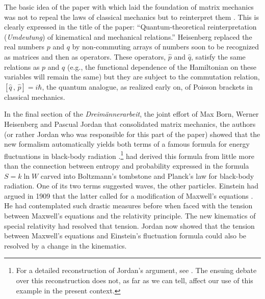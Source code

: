 The basic idea of the paper with which \citet{Heisenberg 1925} laid the foundation of matrix mechanics was not to repeal the laws of classical mechanics but to reinterpret them \citep[p.\ 139]{Janssen 2019}. This is clearly expressed in the title of the paper: ``Quantum-theoretical reinterpretation (\emph{Umdeutung}) of kinematical and mechanical relations.'' Heisenberg replaced the real numbers $p$ and $q$ by non-commuting arrays of numbers soon to be recognized as matrices and then as operators. These operators, $\hat{p}$ and $\hat{q}$, satisfy the same relations as $p$ and $q$ (e.g., the functional dependence of the Hamiltonian on these variables will remain the same) but they are subject to the commutation relation, $[\hat{q} \, , \, \hat{p}] = i\hbar$, the quantum analogue, as \citet{Dirac 1926} realized early on, of Poisson brackets in classical mechanics.

In the final section of the \emph{Dreim\"annerarbeit}, the joint effort of Max Born, Werner Heisenberg and Pascual Jordan that consolidated matrix mechanics, the authors (or rather Jordan who was responsible for this part of the paper) showed that the new formalism automatically yields both terms of a famous formula for energy fluctuations in black-body radiation \citep[pp.\ 375--385]{dreimaenner}.\footnote{For a detailed reconstruction of Jordan's argument, see \citet{Duncan and Janssen 2008}. The ensuing debate over this reconstruction \citep[see, especially,][]{BCM 2017} does not, as far as we can tell, affect our use of this example in the present context.} \citet{Einstein 1909a, Einstein 1909b} had derived this formula from little more than the connection between entropy and probability expressed in the formula $S = k \ln{W}$ carved into Boltzmann's tombstone and Planck's law for black-body radiation. One of its two terms suggested waves, the other particles. Einstein had argued in 1909 that the latter called for a modification of Maxwell's equations \citep[pp.\ 120--126]{Duncan and Janssen 2019}. He had contemplated such drastic measures before when faced with the tension between Maxwell's equations and the relativity principle. The new kinematics of special relativity had resolved that tension. Jordan now showed that the tension between Maxwell's equations and Einstein's fluctuation formula could also be resolved by a change in the kinematics.

